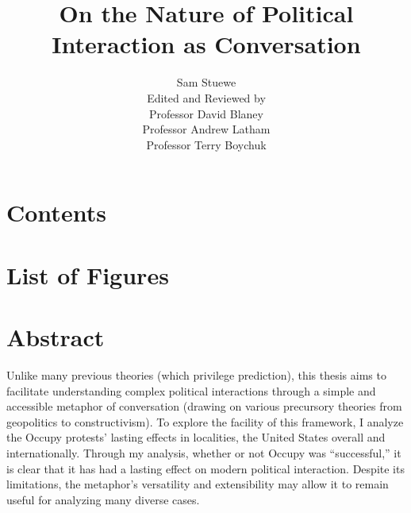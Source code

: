 \documentclass[openany,twoside]{memoir}
\begin{document}
\begin{Spacing}{2}
\title{On the Nature of Political Interaction as Conversation}
\author{Sam Stuewe\\[50ex] Edited and Reviewed by\\ Professor David Blaney\\ Professor Andrew Latham\\ Professor Terry Boychuk}
\date{}
\maketitle
\newpage{}
\thispagestyle{empty}
\mbox{}
\chapter{Contents}
\thispagestyle{fancy}
\makeatletter
{}
\makeatother
\makeatletter
{}
\chapter{List of Figures}
\thispagestyle{fancy}
\makeatother
\newpage{}

\chapter{Abstract}
\thispagestyle{fancy}
Unlike many previous theories (which privilege prediction), this thesis aims to facilitate understanding complex political interactions through a simple and accessible metaphor of conversation (drawing on various precursory theories from geopolitics to constructivism). 
To explore the facility of this framework, I analyze the Occupy protests' lasting effects in localities, the United States overall and internationally. 
Through my analysis, whether or not Occupy was “successful,” it is clear that it has had a lasting effect on modern political interaction. 
Despite its limitations, the metaphor's versatility and extensibility may allow it to remain useful for analyzing many diverse cases.


\end{Spacing}
\end{document}
